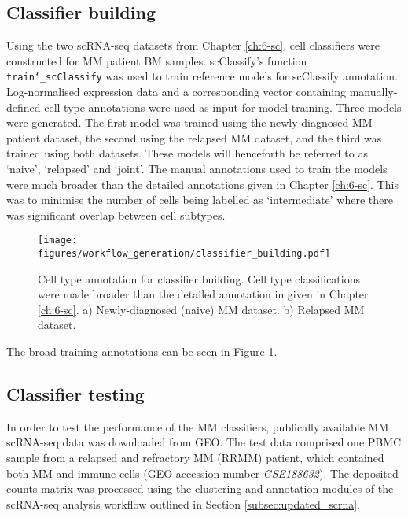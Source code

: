 \subsection{Classifier building}\label{subsec:MM_classifier_model_building}
Using the two scRNA-seq datasets from Chapter \ref{ch:6-sc}, cell classifiers were constructed for MM patient BM samples.
scClassify's function \texttt{train\char`_scClassify} was used to train reference models for scClassify annotation.
Log-normalised expression data and a corresponding vector containing manually-defined cell-type annotations were used as input for model training.
Three models were generated.
The first model was trained using the newly-diagnosed MM patient dataset, the second using the relapsed MM dataset, and the third was trained using both datasets.
These models will henceforth be referred to as `naive', `relapsed' and `joint'.
The manual annotations used to train the models were much broader than the detailed annotations given in Chapter \ref{ch:6-sc}.
This was to minimise the number of cells being labelled as `intermediate' where there was significant overlap between cell subtypes.
%
\begin{figure}[htb]
\centering
\texttt{[image: figures/workflow\_generation/classifier\_building.pdf]}
\caption[Classifier annotation building]{Cell type annotation for classifier building.
Cell type classifications were made broader than the detailed annotation in given in Chapter \ref{ch:6-sc}.
a) Newly-diagnosed (naive) MM dataset.
b) Relapsed MM dataset.}
\label{fig:classifier_building}
\end{figure}
%
The broad training annotations can be seen in Figure \ref{fig:classifier_building}.

\subsection{Classifier testing}
In order to test the performance of the MM classifiers, publically available MM scRNA-seq data was downloaded from GEO\@.
The test data comprised one PBMC sample from a relapsed and refractory MM (RRMM) patient, which contained both MM and immune cells (GEO accession number \textit{GSE188632}).
The deposited counts matrix was processed using the clustering and annotation modules of the scRNA-seq analysis workflow outlined in Section \ref{subsec:updated_scrna}.

